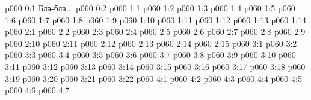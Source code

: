 \author{Носитель Жизни}
\vs p060 0:1  Бла-бла...
\vs p060 0:2 
\vs p060 1:1 
\vs p060 1:2 
\vs p060 1:3 
\vs p060 1:4 
\vs p060 1:5 \pc 
\vs p060 1:6 
\vs p060 1:7 
\vs p060 1:8 
\vs p060 1:9 \pc 
\vs p060 1:10 
\vs p060 1:11 
\vs p060 1:12 
\vs p060 1:13 \pc 
\vs p060 1:14 \pc 
{}
\vs p060 2:1 
\vs p060 2:2 
\vs p060 2:3 
\vs p060 2:4 
\vs p060 2:5 
\vs p060 2:6 
\vs p060 2:7 
\vs p060 2:8 
\vs p060 2:9 \pc 
\vs p060 2:10 
\vs p060 2:11 
\vs p060 2:12 
\vs p060 2:13 
\vs p060 2:14 \pc 
\vs p060 2:15 \pc 
{}
\vs p060 3:1 
\vs p060 3:2 
\vs p060 3:3 
\vs p060 3:4 \pc 
\vs p060 3:5 \pc 
\vs p060 3:6 
\vs p060 3:7 \pc 
\vs p060 3:8 \pc 
\vs p060 3:9 
\vs p060 3:10 
\vs p060 3:11 \pc 
\vs p060 3:12 \pc 
\vs p060 3:13 
\vs p060 3:14 \pc 
\vs p060 3:15 
\vs p060 3:16 \pc 
\vs p060 3:17 
\vs p060 3:18 
\vs p060 3:19 
\vs p060 3:20 \pc 
\vs p060 3:21 
\vs p060 3:22 \pc 
{}
\vs p060 4:1 
\vs p060 4:2 
\vs p060 4:3 \pc 
\vs p060 4:4 
\vs p060 4:5 
\vs p060 4:6 \pc 
\vsetoff
\vs p060 4:7 
\quizlink
